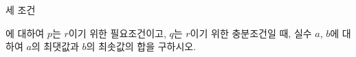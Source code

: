 세 조건 \par\smallskip{}\par\smallskip\noindent 에 대하여 $p$는 $r$이기 위한 필요조건이고, $q$는 $r$이기 위한 충분조건일 때, 실수 $a$, $b$에 대하여 $a$의 최댓값과 $b$의 최솟값의 합을 구하시오. 
